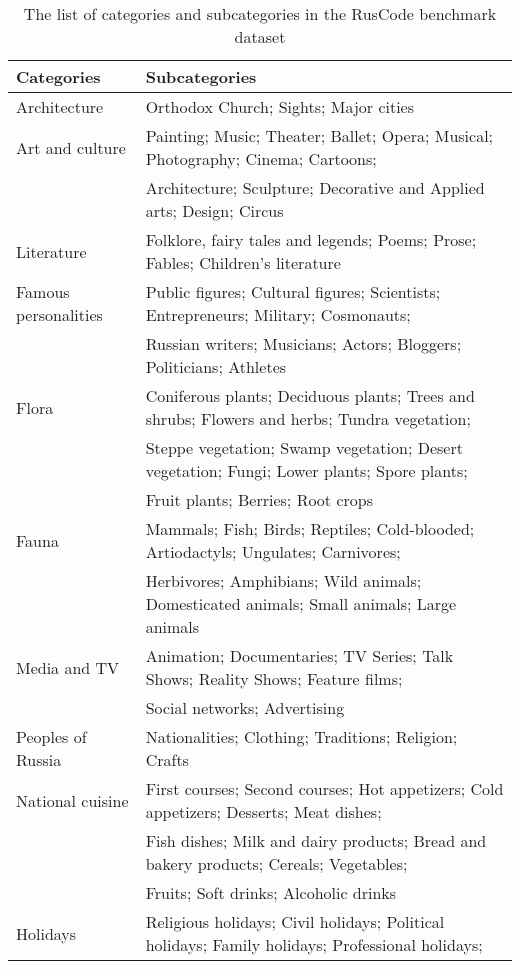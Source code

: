 \begin{table*}[!t]
\caption{The list of categories and subcategories in the RusCode benchmark dataset}   
\centering
\small
\begin{tabular}{ll}
    \hline
    \textbf{Categories} & \textbf{Subcategories} \\
    \hline
    Architecture & Orthodox Church; Sights; Major cities\\
    \hline
    Art and culture & Painting; Music; Theater; Ballet; Opera; Musical; Photography; Cinema; Cartoons;\\
    & Architecture; Sculpture; Decorative and Applied arts; Design; Circus\\
    \hline
    Literature & Folklore, fairy tales and legends; Poems; Prose; Fables; Children's literature\\
    \hline
    Famous personalities & Public figures; Cultural figures; Scientists; Entrepreneurs; Military; Cosmonauts;\\
    & Russian writers; Musicians; Actors; Bloggers; Politicians; Athletes\\
    \hline
    Flora & Coniferous plants; Deciduous plants; Trees and shrubs; Flowers and herbs; Tundra vegetation;\\
    & Steppe vegetation; Swamp vegetation; Desert vegetation; Fungi; Lower plants; Spore plants;\\
    & Fruit plants; Berries; Root crops\\
    \hline
    Fauna & Mammals; Fish; Birds; Reptiles; Cold-blooded; Artiodactyls; Ungulates; Carnivores;\\
    & Herbivores; Amphibians; Wild animals; Domesticated animals; Small animals; Large animals\\
    \hline
    Media and TV & Animation; Documentaries; TV Series; Talk Shows; Reality Shows; Feature films;\\
    & Social networks; Advertising\\
    \hline
    Peoples of Russia & Nationalities; Clothing; Traditions; Religion; Crafts\\
    \hline
    National cuisine & First courses; Second courses; Hot appetizers; Cold appetizers; Desserts; Meat dishes;\\
    & Fish dishes; Milk and dairy products; Bread and bakery products; Cereals; Vegetables;\\
    & Fruits; Soft drinks; Alcoholic drinks\\
    \hline
    Holidays & Religious holidays; Civil holidays; Political holidays; Family holidays; Professional holidays;\\

\end{tabular}
\end{table*}
